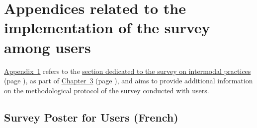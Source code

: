     \setcounter{section}{0}
\chapter{Appendices related to the implementation of the survey among users}
    \label{annexes:questionnaire-usagers}

\hyperref[annexes:questionnaire-usagers]{Appendix~\ref{annexes:questionnaire-usagers}} refers to the \hyperref[chap3:questionnaire]{section dedicated to the survey on intermodal practices} (page \pageref{chap3:questionnaire}), as part of \hyperref[chap3:titre]{Chapter~3} (page \pageref{chap3:titre}), and aims to provide additional information on the methodological protocol of the survey conducted with users.%

    \setcounter{tocdepth}{2}
    \renewcommand{\localcontentsname}{Structure of Appendix~\ref{annexes:questionnaire-usagers}}
\localtableofcontents

    \newpage
\section{Survey Poster for Users (French)}
    \label{annexes:affiche-en-questionnaire-usagers}

